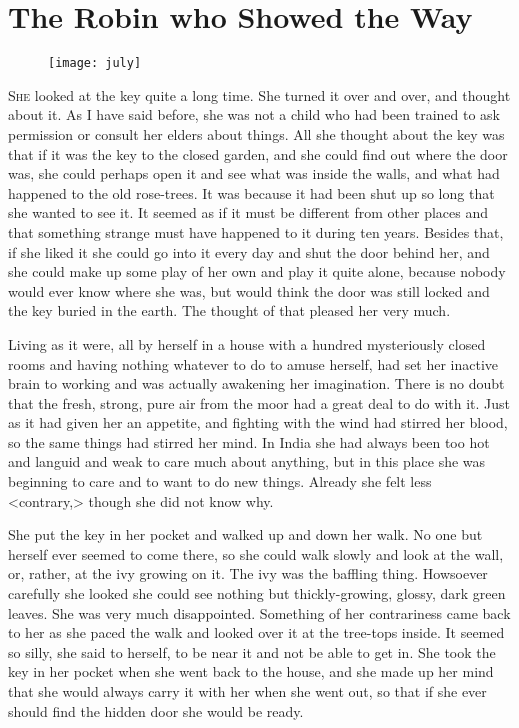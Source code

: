 \chapter{The Robin who Showed the Way} 
	
\begin{figure}[t!]
\centering
\texttt{[image: july]}
\end{figure}

 \lettrine[]{S}{he} looked at the key quite a long time. She turned it over and over, and thought about it. As I have said before, she was not a child who had been trained to ask permission or consult her elders about things. All she thought about the key was that if it was the key to the closed garden, and she could find out where the door was, she could perhaps open it and see what was inside the walls, and what had happened to the old rose-trees. It was because it had been shut up so long that she wanted to see it. It seemed as if it must be different from other places and that something strange must have happened to it during ten years. Besides that, if she liked it she could go into it every day and shut the door behind her, and she could make up some play of her own and play it quite alone, because nobody would ever know where she was, but would think the door was still locked and the key buried in the earth. The thought of that pleased her very much.

Living as it were, all by herself in a house with a hundred mysteriously closed rooms and having nothing whatever to do to amuse herself, had set her inactive brain to working and was actually awakening her imagination. There is no doubt that the fresh, strong, pure air from the moor had a great deal to do with it. Just as it had given her an appetite, and fighting with the wind had stirred her blood, so the same things had stirred her mind. In India she had always been too hot and languid and weak to care much about anything, but in this place she was beginning to care and to want to do new things. Already she felt less <contrary,> though she did not know why.

She put the key in her pocket and walked up and down her walk. No one but herself ever seemed to come there, so she could walk slowly and look at the wall, or, rather, at the ivy growing on it. The ivy was the baffling thing. Howsoever carefully she looked she could see nothing but thickly-growing, glossy, dark green leaves. She was very much disappointed. Something of her contrariness came back to her as she paced the walk and looked over it at the tree-tops inside. It seemed so silly, she said to herself, to be near it and not be able to get in. She took the key in her pocket when she went back to the house, and she made up her mind that she would always carry it with her when she went out, so that if she ever should find the hidden door she would be ready.

